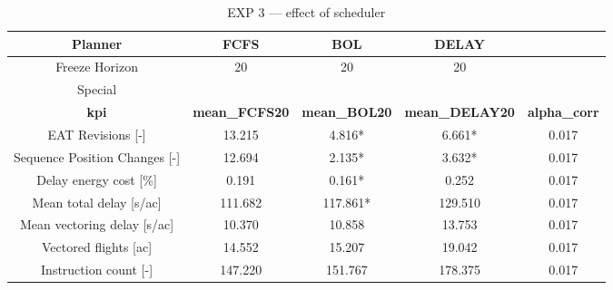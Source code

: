 \begin{table}[htbp]
\caption{EXP 3 — effect of scheduler}
\begin{center}
\footnotesize
\setlength{\tabcolsep}{3pt}
\renewcommand{\arraystretch}{1.000}
\begin{tabular}{|c|c|c|c|c|}
\hline
Planner & FCFS & BOL & DELAY &  \\
\hline
Freeze Horizon & 20 & 20 & 20 &  \\
\hline
Special &  &  &  &  \\
\hline
\textbf{kpi} & \textbf{mean\_FCFS20} & \textbf{mean\_BOL20} & \textbf{mean\_DELAY20} & \textbf{alpha\_corr} \\
\hline
EAT Revisions [-] & 13.215 & 4.816* & 6.661* & 0.017 \\
\hline
Sequence Position Changes [-] & 12.694 & 2.135* & 3.632* & 0.017 \\
\hline
Delay energy cost [\%] & 0.191 & 0.161* & 0.252 & 0.017 \\
\hline
Mean total delay [s/ac] & 111.682 & 117.861* & 129.510 & 0.017 \\
\hline
Mean vectoring delay [s/ac] & 10.370 & 10.858 & 13.753 & 0.017 \\
\hline
Vectored flights [ac] & 14.552 & 15.207 & 19.042 & 0.017 \\
\hline
Instruction count [-] & 147.220 & 151.767 & 178.375 & 0.017 \\
\hline
\end{tabular}
\label{tab:exp\_3\_effect\_of\_scheduler}
\end{center}
\end{table}